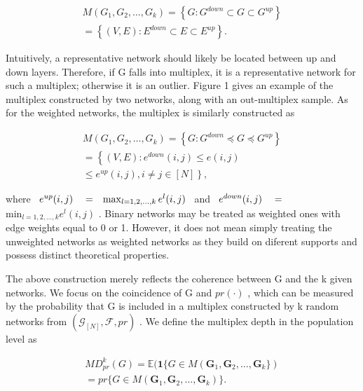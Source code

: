 \documentclass[
  10
]{article}
\begin{document}
\[
\begin{array}{c} M (G _ {1}, G _ {2}, \ldots , G _ {k}) = \left\{G: G ^ {d o w n} \subset G \subset G ^ {u p} \right\} \\ = \left\{(V, E): E ^ {d o w n} \subset E \subset E ^ {u p} \right\}. \end{array}\tag{1}
\]

Intuitively, a representative network should likely be located between
up and down layers. Therefore, if G falls into multiplex, it is a
representative network for such a multiplex; otherwise it is an outlier.
Figure 1 gives an example of the multiplex constructed by two networks,
along with an out-multiplex sample. As for the weighted networks, the
multiplex is similarly constructed as

\[
\begin{array}{c} M (G _ {1}, G _ {2}, \dots , G _ {k}) = \left\{G: G ^ {d o w n} \preceq G \preceq G ^ {u p} \right\} \\ = \left\{(V, E): e ^ {d o w n} (i, j) \leq e (i, j) \right. \\ \left. \leq e ^ {u p} (i, j), i \neq j \in [ N ] \right\}, \end{array}\tag{2}
\]

where
\(\begin{array} { r l r } { e ^ { u p } ( i , j ) } & { { } = } & { \operatorname* { m a x } _ { l = 1 , 2 , \ldots , k } e ^ { l } ( i , j ) } \end{array}\)
and
\(\begin{array} { r l } { e ^ { d o w n } ( i , j ) } & { { } = } \end{array}\)
\(\mathrm { m i n } _ { l = 1 , 2 , \ldots , k } e ^ { l } ( i , j )\) .
Binary networks may be treated as weighted ones with edge weights equal
to 0 or 1. However, it does not mean simply treating the unweighted
networks as weighted networks as they build on diferent supports and
possess distinct theoretical properties.

The above construction merely reflects the coherence between G and the k
given networks. We focus on the coincidence of G and \(p r ( \cdot )\) ,
which can be measured by the probability that G is included in a
multiplex constructed by k random networks from
\(( \mathcal { G } _ { [ N ] } , \mathcal { F } , p r )\) . We define
the multiplex depth in the population level as

\[
\begin{array}{c} M D _ {p r} ^ {k} (G) = \mathbb {E} (\mathbf {1} \{G \in M (\mathbf {G} _ {1}, \mathbf {G} _ {2}, \ldots , \mathbf {G} _ {k} \}) \\ = p r \{G \in M (\mathbf {G} _ {1}, \mathbf {G} _ {2}, \ldots , \mathbf {G} _ {k}) \}. \end{array}\tag{3}
\]
\end{document}
